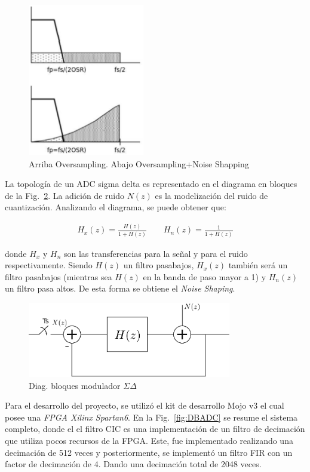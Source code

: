 \documentclass[a4paper,conference]{IEEEtran}
\begin{document}
\begin{figure}[!b]
\centering
\includegraphics[width=2in]{Noise_Shaping.eps}
\caption{Arriba Oversampling. Abajo Oversampling+Noise Shapping}
\label{fig:NS}
\end{figure}

La topolog\'ia de un ADC sigma delta es representado en el diagrama en bloques de la Fig.~\ref{fig:SDTD}. La adición de ruido $N(z)$ es la modelización del ruido de cuantización. Analizando el diagrama, se puede obtener que:

\begin{align}
H_x(z)=\frac{H(z)}{1+H(z)} \qquad
H_n(z)=\frac{1}{1+H(z)}
\end{align}

donde $H_x$ y $H_n$ son las transferencias para la señal y para el ruido respectivamente. Siendo $H(z)$ un filtro pasabajos, $H_x(z)$ también será un filtro pasabajos (mientras sea $H(z)$ en la banda de paso mayor a 1) y $H_n(z)$ un filtro pasa altos. De esta forma se obtiene el \textit{Noise Shaping}.

\begin{figure}[!t]
\centering
\includegraphics[width=3.5in]{Sigma-Delta_Tiempo_Discreto.eps}
\caption{Diag. bloques modulador $\Sigma\Delta$}
\label{fig:SDTD}
\end{figure}

Para el desarrollo del proyecto, se utilizó el kit de desarrollo Mojo v3 el cual posee una \textit{FPGA Xilinx Spartan6}. En la Fig.~\ref{fig:DBADC} se resume el sistema completo, donde el el filtro CIC es una implementación de un filtro de decimación que utiliza pocos recursos de la FPGA. Este, fue implementado realizando una decimación de 512 veces y posteriormente, se implementó un filtro FIR con un factor de decimación de 4. Dando una decimación total de 2048 veces.
\end{document}
